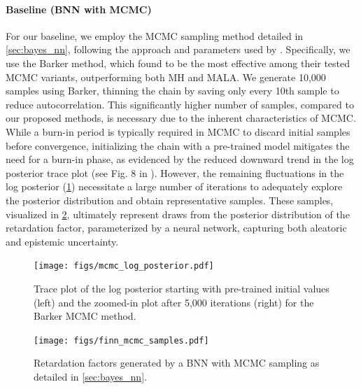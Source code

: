 \paragraph{Baseline (BNN with MCMC)}
For our baseline, we employ the MCMC sampling method detailed in \cref{sec:bayes_nn}, following the approach and parameters used by \textcite{finn}. Specifically, we use the Barker method, which \textcite{finn} found to be the most effective among their tested MCMC variants, outperforming both MH and MALA. We generate 10,000 samples using Barker, thinning the chain by saving only every 10th sample to reduce autocorrelation. This significantly higher number of samples, compared to our proposed methods, is necessary due to the inherent characteristics of MCMC. While a burn-in period is typically required in MCMC to discard initial samples before convergence, initializing the chain with a pre-trained model mitigates the need for a burn-in phase, as evidenced by the reduced downward trend in the log posterior trace plot (see Fig. 8 in \textcite{finn}). However, the remaining fluctuations in the log posterior (\cref{fig:mcmc_log_posterior}) necessitate a large number of iterations to adequately explore the posterior distribution and obtain representative samples. These samples, visualized in \cref{fig:mcmc_samples}, ultimately represent draws from the posterior distribution of the retardation factor, parameterized by a neural network, capturing both aleatoric and epistemic uncertainty.

\begin{figure}[h!]
    \centering
    \texttt{[image: figs/mcmc\_log\_posterior.pdf]}
    \caption{Trace plot of the log posterior starting with pre-trained initial values (left) and the zoomed-in plot after 5,000 iterations (right) for the Barker MCMC method.}
    \label{fig:mcmc_log_posterior}
\end{figure}

\begin{figure}[h!]
    \centering
    \texttt{[image: figs/finn\_mcmc\_samples.pdf]}
    \caption{Retardation factors generated by a BNN with MCMC sampling as detailed in \cref{sec:bayes_nn}.}
    \label{fig:mcmc_samples}
\end{figure}


